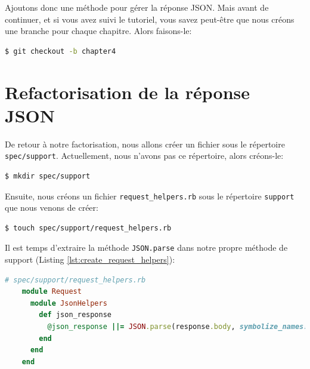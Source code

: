 \documentclass[]{report}
\begin{document}
  Ajoutons donc une méthode pour gérer la réponse JSON. Mais avant de continuer, et si vous avez suivi le tutoriel, vous savez peut-être que nous créons une branche pour chaque chapitre. Alors faisons-le:

  \begin{scriptsize}
  \begin{lstlisting}[language=bash]
  $ git checkout -b chapter4
  \end{lstlisting}
  \end{scriptsize}

  \section{Refactorisation de la réponse JSON}\label{sec:refactoring_json_response}

    De retour à notre factorisation, nous allons créer un fichier sous le répertoire \verb|spec/support|. Actuellement, nous n'avons pas ce répertoire, alors créons-le:

    \begin{scriptsize}
    \begin{lstlisting}[language=bash]
    $ mkdir spec/support
    \end{lstlisting}
    \end{scriptsize}

    Ensuite, nous créons un fichier \verb|request_helpers.rb| sous le répertoire \verb|support| que nous venons de créer:

    \begin{scriptsize}
    \begin{lstlisting}[language=bash]
    $ touch spec/support/request_helpers.rb
    \end{lstlisting}
    \end{scriptsize}

    Il est temps d'extraire la méthode \verb|JSON.parse| dans notre propre méthode de support (Listing \ref{lst:create_request_helpers}):

    \begin{scriptsize}
    \begin{lstlisting}[language=ruby, caption={Extraction de la méthode JSON.parse}, label={lst:create_request_helpers}]
    # spec/support/request_helpers.rb
    module Request
      module JsonHelpers
        def json_response
          @json_response ||= JSON.parse(response.body, symbolize_names: true)
        end
      end
    end
    \end{lstlisting}
    \end{scriptsize}
\end{document}
